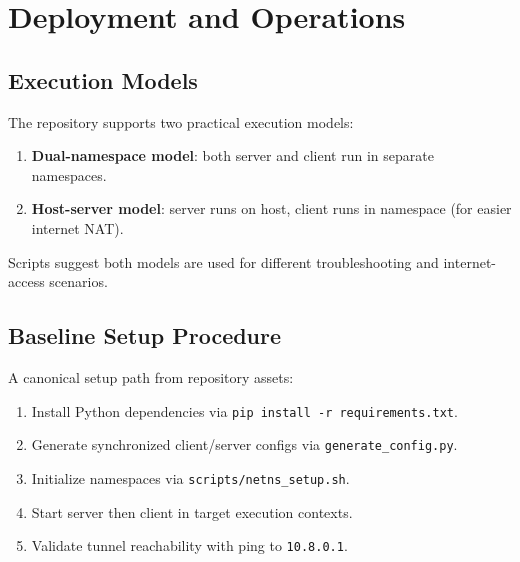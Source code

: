 \chapter{Deployment and Operations}

\section{Execution Models}
The repository supports two practical execution models:
\begin{enumerate}[leftmargin=2em]
\item \textbf{Dual-namespace model}: both server and client run in separate namespaces.
\item \textbf{Host-server model}: server runs on host, client runs in namespace (for easier internet NAT).
\end{enumerate}

Scripts suggest both models are used for different troubleshooting and internet-access scenarios.

\section{Baseline Setup Procedure}
A canonical setup path from repository assets:
\begin{enumerate}[leftmargin=2em]
\item Install Python dependencies via \texttt{pip install -r requirements.txt}.
\item Generate synchronized client/server configs via \texttt{generate\_config.py}.
\item Initialize namespaces via \texttt{scripts/netns\_setup.sh}.
\item Start server then client in target execution contexts.
\item Validate tunnel reachability with ping to \texttt{10.8.0.1}.
\end{enumerate}

